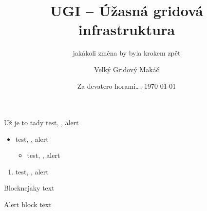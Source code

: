 \documentclass[smaller]{beamer}
\begin{document}
\title{UGI -- Úžasná gridová infrastruktura}
\subtitle{jakákoli změna by byla krokem zpět}
\author[BigG]{Velký Gridový Makáč}
\date[\today]{Za devatero horami\dots, \today}

\begin{frame}[plain]
\maketitle
\end{frame}

\begin{frame}{Už je to tady}
test, , \alert{alert}
\begin{itemize}
  \item test, , \alert{alert}
\begin{itemize}
\item  test, , \alert{alert}
\end{itemize}
\end{itemize}
\begin{enumerate}
\item test, , \alert{alert}
\end{enumerate}

\begin{block}{Block}nejaky text\end{block}
\begin{alertblock}{Alert block}
  text
\end{alertblock}




\end{frame}
\end{document}
